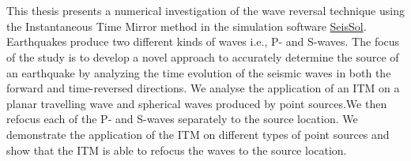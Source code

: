 \chapter{\abstractname}

This thesis presents a numerical investigation of the wave reversal technique using the Instantaneous 
Time Mirror method in the simulation software \href{https://seissol.org/}{SeisSol}. Earthquakes produce two different kinds of waves i.e., P- and S-waves. 
The focus of the study is to develop a novel approach to accurately determine the source of an earthquake by analyzing the time evolution 
of the seismic waves in both the forward and time-reversed directions. We analyse the application of an \acf{ITM} on a planar travelling wave and spherical waves
produced by point sources.We then refocus each of the P- and S-waves separately to the source location. We demonstrate the application
of the \ac{ITM} on different types of point sources and show that the \ac{ITM} is able to refocus the waves to the source location.